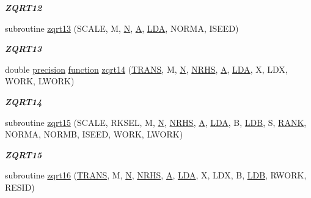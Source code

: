 \begin{DoxyCompactItemize}
\begin{DoxyCompactList}\small\item\em {\bfseries Z\+Q\+R\+T12} \end{DoxyCompactList}\item 
subroutine \hyperlink{group__complex16__lin_ga951addfdb4cc63d6a52f018e7f86475a}{zqrt13} (S\+C\+A\+L\+E, M, \hyperlink{polmisc_8c_a0240ac851181b84ac374872dc5434ee4}{N}, \hyperlink{classA}{A}, \hyperlink{example__user_8c_ae946da542ce0db94dced19b2ecefd1aa}{L\+D\+A}, N\+O\+R\+M\+A, I\+S\+E\+E\+D)
\begin{DoxyCompactList}\small\item\em {\bfseries Z\+Q\+R\+T13} \end{DoxyCompactList}\item 
double \hyperlink{numinquire_8h_a2c8e616467665d0b2814d4c1589ba74e}{precision} \hyperlink{afunc_8m_a7b5e596df91eadea6c537c0825e894a7}{function} \hyperlink{group__complex16__lin_ga846ca3824ade08e7938f8519765af9cd}{zqrt14} (\hyperlink{superlu__enum__consts_8h_a0c4e17b2d5cea33f9991ccc6a6678d62a1f61e3015bfe0f0c2c3fda4c5a0cdf58}{T\+R\+A\+N\+S}, M, \hyperlink{polmisc_8c_a0240ac851181b84ac374872dc5434ee4}{N}, \hyperlink{example__user_8c_aa0138da002ce2a90360df2f521eb3198}{N\+R\+H\+S}, \hyperlink{classA}{A}, \hyperlink{example__user_8c_ae946da542ce0db94dced19b2ecefd1aa}{L\+D\+A}, X, L\+D\+X, W\+O\+R\+K, L\+W\+O\+R\+K)
\begin{DoxyCompactList}\small\item\em {\bfseries Z\+Q\+R\+T14} \end{DoxyCompactList}\item 
subroutine \hyperlink{group__complex16__lin_ga735c9303428c07c530254e61506b1a2e}{zqrt15} (S\+C\+A\+L\+E, R\+K\+S\+E\+L, M, \hyperlink{polmisc_8c_a0240ac851181b84ac374872dc5434ee4}{N}, \hyperlink{example__user_8c_aa0138da002ce2a90360df2f521eb3198}{N\+R\+H\+S}, \hyperlink{classA}{A}, \hyperlink{example__user_8c_ae946da542ce0db94dced19b2ecefd1aa}{L\+D\+A}, B, \hyperlink{example__user_8c_a50e90a7104df172b5a89a06c47fcca04}{L\+D\+B}, S, \hyperlink{splinemodule_8c_a3a88bcc63386de30443dacede2e01847}{R\+A\+N\+K}, N\+O\+R\+M\+A, N\+O\+R\+M\+B, I\+S\+E\+E\+D, W\+O\+R\+K, L\+W\+O\+R\+K)
\begin{DoxyCompactList}\small\item\em {\bfseries Z\+Q\+R\+T15} \end{DoxyCompactList}\item 
subroutine \hyperlink{group__complex16__lin_ga3923aca089a56be98bd3954ef9b35e25}{zqrt16} (\hyperlink{superlu__enum__consts_8h_a0c4e17b2d5cea33f9991ccc6a6678d62a1f61e3015bfe0f0c2c3fda4c5a0cdf58}{T\+R\+A\+N\+S}, M, \hyperlink{polmisc_8c_a0240ac851181b84ac374872dc5434ee4}{N}, \hyperlink{example__user_8c_aa0138da002ce2a90360df2f521eb3198}{N\+R\+H\+S}, \hyperlink{classA}{A}, \hyperlink{example__user_8c_ae946da542ce0db94dced19b2ecefd1aa}{L\+D\+A}, X, L\+D\+X, B, \hyperlink{example__user_8c_a50e90a7104df172b5a89a06c47fcca04}{L\+D\+B}, R\+W\+O\+R\+K, R\+E\+S\+I\+D)

\end{DoxyCompactItemize}
